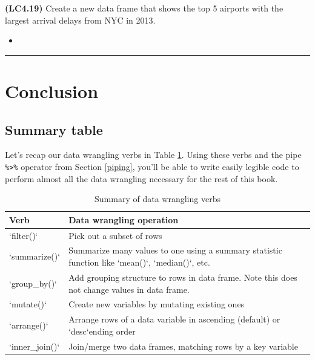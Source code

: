 \documentclass[12pt, krantz2,]{krantz}
\newenvironment{rmdblock}[1]
  {\begin{shaded*}
  \begin{itemize}
  \renewcommand{\labelitemi}{
    \raisebox{-.7\height}[0pt][0pt]{
    }
  }
  \item
  }
  {
  \end{itemize}
  \end{shaded*}
  }
\newenvironment{learncheck}
  {\begin{rmdblock}{warning}}
  {\end{rmdblock}}
\begin{document}
\textbf{(LC4.19)} Create a new data frame that shows the top 5 airports with the largest arrival delays from NYC in 2013.

\begin{learncheck}

\end{learncheck}

\begin{center}\rule{0.5\linewidth}{\linethickness}\end{center}

\hypertarget{conclusion-2}{%
\section{Conclusion}\label{conclusion-2}}

\hypertarget{summary-table-1}{%
\subsection{Summary table}\label{summary-table-1}}

Let's recap our data wrangling verbs in Table \ref{tab:wrangle-summary-table}. Using these verbs and the pipe \texttt{\%\textgreater{}\%} operator from Section \ref{piping}, you'll be able to write easily legible code to perform almost all the data wrangling necessary for the rest of this book.

\begin{table}[H]

\caption{\label{tab:wrangle-summary-table}Summary of data wrangling verbs}
\centering
\fontsize{10}{12}\selectfont
\begin{tabular}{>{\raggedright\arraybackslash}p{0.9in}>{\raggedright\arraybackslash}p{3.3in}}
\toprule
Verb & Data wrangling operation\\
\midrule
`filter()` & Pick out a subset of rows\\
`summarize()` & Summarize many values to one using a summary statistic function like `mean()`, `median()`, etc.\\
`group\_by()` & Add grouping structure to rows in data frame. Note this does not change values in data frame.\\
`mutate()` & Create new variables by mutating existing ones\\
`arrange()` & Arrange rows of a data variable in ascending (default) or `desc`ending order\\
\addlinespace
`inner\_join()` & Join/merge two data frames, matching rows by a key variable\\
\bottomrule
\end{tabular}
\end{table}
\end{document}
